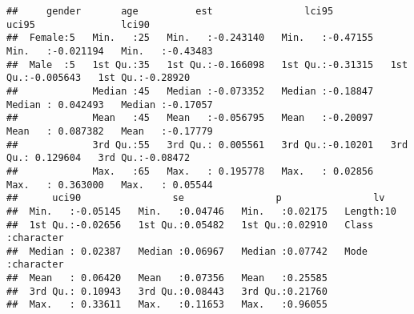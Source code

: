 \documentclass[
]{article}
\begin{document}
\begin{verbatim}
##     gender       age          est                lci95              uci95               lci90         
##  Female:5   Min.   :25   Min.   :-0.243140   Min.   :-0.47155   Min.   :-0.021194   Min.   :-0.43483  
##  Male  :5   1st Qu.:35   1st Qu.:-0.166098   1st Qu.:-0.31315   1st Qu.:-0.005643   1st Qu.:-0.28920  
##             Median :45   Median :-0.073352   Median :-0.18847   Median : 0.042493   Median :-0.17057  
##             Mean   :45   Mean   :-0.056795   Mean   :-0.20097   Mean   : 0.087382   Mean   :-0.17779  
##             3rd Qu.:55   3rd Qu.: 0.005561   3rd Qu.:-0.10201   3rd Qu.: 0.129604   3rd Qu.:-0.08472  
##             Max.   :65   Max.   : 0.195778   Max.   : 0.02856   Max.   : 0.363000   Max.   : 0.05544  
##      uci90                se                p                lv           
##  Min.   :-0.05145   Min.   :0.04746   Min.   :0.02175   Length:10         
##  1st Qu.:-0.02656   1st Qu.:0.05482   1st Qu.:0.02910   Class :character  
##  Median : 0.02387   Median :0.06967   Median :0.07742   Mode  :character  
##  Mean   : 0.06420   Mean   :0.07356   Mean   :0.25585                     
##  3rd Qu.: 0.10943   3rd Qu.:0.08443   3rd Qu.:0.21760                     
##  Max.   : 0.33611   Max.   :0.11653   Max.   :0.96055
\end{verbatim}
\end{document}
